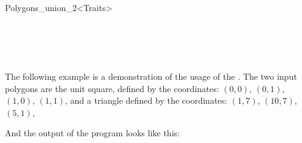 \begin{ccRefFunctionObjectClass}{Polygons_union_2<Traits>}
\ccSeeAlso

 \\
 \\
 \\
 \\



\ccExample
\label{sec:example1_polygon_bops}
The following example is a demonstration of the usage of the 
\ccClassTemplateName . 
The two input polygons are the unit square,
defined by the coordinates: 
$(0,0)$, $(0,1)$, $(1,0)$, $(1,1)$, 
and a triangle defined by the coordinates:
$(1,7)$, $(10,7)$, $(5,1)$,


And the output of the program looks like this:


\end{ccRefFunctionObjectClass}

\ccRefPageEnd








